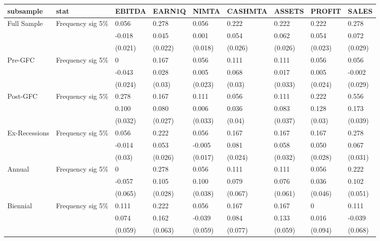 
\begin{tabular}{l|l|l|l|l|l|l|l|l}
\hline
subsample & stat & EBITDA & EARN1Q & NIMTA & CASHMTA & ASSETS & PROFIT & SALES\\
\hline
Full Sample & Frequency sig 5\% & 0.056 & 0.278 & 0.056 & 0.222 & 0.222 & 0.222 & 0.278\\
 &  & -0.018 & 0.045 & 0.001 & 0.054 & 0.062 & 0.054 & 0.072\\
 &  & (0.021) & (0.022) & (0.018) & (0.026) & (0.026) & (0.023) & (0.029)\\
Pre-GFC & Frequency sig 5\% & 0 & 0.167 & 0.056 & 0.111 & 0.111 & 0.056 & 0.056\\
 &  & -0.043 & 0.028 & 0.005 & 0.068 & 0.017 & 0.005 & -0.002\\
 &  & (0.024) & (0.03) & (0.023) & (0.03) & (0.033) & (0.024) & (0.029)\\
Post-GFC & Frequency sig 5\% & 0.278 & 0.167 & 0.111 & 0.056 & 0.111 & 0.222 & 0.556\\
 &  & 0.100 & 0.080 & 0.006 & 0.036 & 0.083 & 0.128 & 0.173\\
 &  & (0.032) & (0.027) & (0.033) & (0.04) & (0.037) & (0.03) & (0.039)\\
Ex-Recessions & Frequency sig 5\% & 0.056 & 0.222 & 0.056 & 0.167 & 0.167 & 0.167 & 0.278\\
 &  & -0.014 & 0.053 & -0.005 & 0.081 & 0.058 & 0.050 & 0.067\\
 &  & (0.03) & (0.026) & (0.017) & (0.024) & (0.032) & (0.028) & (0.031)\\
Annual & Frequency sig 5\% & 0 & 0.278 & 0.056 & 0.111 & 0.111 & 0.056 & 0.222\\
 &  & -0.057 & 0.105 & 0.100 & 0.079 & 0.076 & 0.036 & 0.102\\
 &  & (0.065) & (0.028) & (0.038) & (0.067) & (0.061) & (0.046) & (0.051)\\
Biennial & Frequency sig 5\% & 0.111 & 0.222 & 0.056 & 0.167 & 0.167 & 0 & 0.111\\
 &  & 0.074 & 0.162 & -0.039 & 0.084 & 0.133 & 0.016 & -0.039\\
 &  & (0.059) & (0.063) & (0.059) & (0.077) & (0.059) & (0.094) & (0.068)\\
\hline
\end{tabular}
